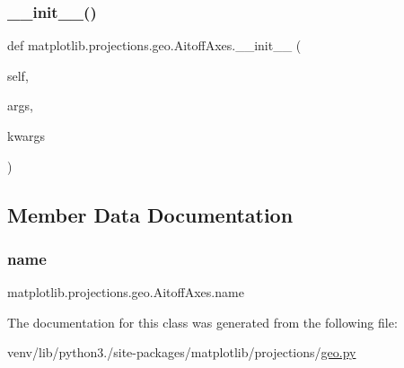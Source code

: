 \subsubsection{\texorpdfstring{\+\_\+\+\_\+init\+\_\+\+\_\+()}{\_\_init\_\_()}}
{\footnotesize\ttfamily def matplotlib.\+projections.\+geo.\+Aitoff\+Axes.\+\_\+\+\_\+init\+\_\+\+\_\+ (\begin{DoxyParamCaption}\item[{}]{self,  }\item[{}]{args,  }\item[{}]{kwargs }\end{DoxyParamCaption})}



\subsection{Member Data Documentation}
\mbox{\label{classmatplotlib_1_1projections_1_1geo_1_1AitoffAxes_a1248da04fab849dd43f5c88286f3b5b9}} 
\subsubsection{\texorpdfstring{name}{name}}
{\footnotesize\ttfamily matplotlib.\+projections.\+geo.\+Aitoff\+Axes.\+name\hspace{0.3cm}{\ttfamily [static]}}



The documentation for this class was generated from the following file\+:\begin{DoxyCompactItemize}
\item 
venv/lib/python3./site-\/packages/matplotlib/projections/\hyperlink{geo_8py}{geo.\+py}\end{DoxyCompactItemize}
